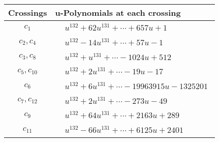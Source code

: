 \documentclass[1p]{elsarticle_modified}
\theoremstyle{definition}
\begin{document}
\begin{tabular}{m{50pt}|m{274pt}}
Crossings & \hspace{64pt}u-Polynomials at each crossing \\
\hline $$\begin{aligned}c_{1}\end{aligned}$$&$\begin{aligned}
&u^{132}+62 u^{131}+\cdots+657 u+1
\end{aligned}$\\
\hline $$\begin{aligned}c_{2},c_{4}\end{aligned}$$&$\begin{aligned}
&u^{132}-14 u^{131}+\cdots+57 u-1
\end{aligned}$\\
\hline $$\begin{aligned}c_{3},c_{8}\end{aligned}$$&$\begin{aligned}
&u^{132}+u^{131}+\cdots-1024 u+512
\end{aligned}$\\
\hline $$\begin{aligned}c_{5},c_{10}\end{aligned}$$&$\begin{aligned}
&u^{132}+2 u^{131}+\cdots-19 u-17
\end{aligned}$\\
\hline $$\begin{aligned}c_{6}\end{aligned}$$&$\begin{aligned}
&u^{132}+6 u^{131}+\cdots-19963915 u-1325201
\end{aligned}$\\
\hline $$\begin{aligned}c_{7},c_{12}\end{aligned}$$&$\begin{aligned}
&u^{132}+2 u^{131}+\cdots-273 u-49
\end{aligned}$\\
\hline $$\begin{aligned}c_{9}\end{aligned}$$&$\begin{aligned}
&u^{132}+64 u^{131}+\cdots+2163 u+289
\end{aligned}$\\
\hline $$\begin{aligned}c_{11}\end{aligned}$$&$\begin{aligned}
&u^{132}-66 u^{131}+\cdots+6125 u+2401
\end{aligned}$\\
\hline
\end{tabular}\\~\\
\end{document}
